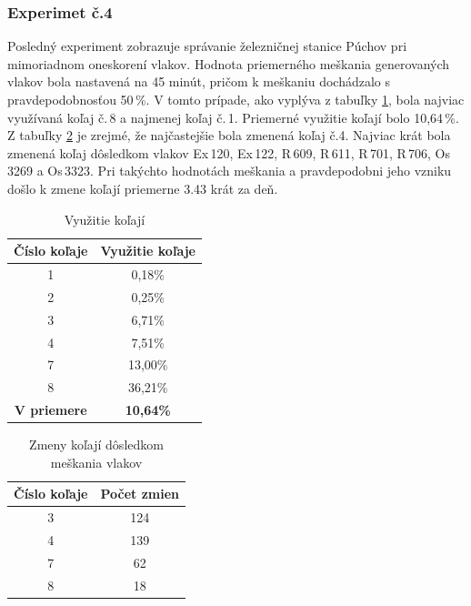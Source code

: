 \documentclass[12pt,a4paper,titlepage,final]{article}
\begin{document}
\subsubsection{Experimet č.4}

Posledný experiment zobrazuje správanie železničnej stanice Púchov pri mimoriadnom oneskorení vlakov. Hodnota priemerného meškania generovaných vlakov bola nastavená na 45 minút, pričom k  meškaniu dochádzalo s pravdepodobnosťou 50\,\%. V tomto prípade, ako vyplýva z tabuľky \ref{tab6}, bola najviac využívaná koľaj č.\,8 a najmenej koľaj č.\,1. Priemerné využitie koľají bolo 10,64\,\%. Z tabuľky \ref{tab7} je zrejmé, že najčastejšie bola zmenená koľaj č.4. Najviac krát bola zmenená koľaj dôsledkom vlakov Ex\,120, Ex\,122, R\,609, R\,611, R\,701, R\,706, Os\,3269 a Os\,3323. Pri takýchto hodnotách meškania a pravdepodobni jeho vzniku došlo k zmene koľají priemerne 3.43 krát za deň.

\begin{table}[h]
\centering
\begin{center}
\begin{tabular}{| c | c |}
\hline
{\textbf{Číslo koľaje}} & {\textbf{Využitie koľaje}} \\
\hline
1 & 0,18\% \\
2 & 0,25\% \\
3 & 6,71\% \\
4 & 7,51\% \\
7 & 13,00\% \\
8 & 36,21\% \\
\hline
{\textbf{V priemere}} & {\textbf{10,64\%}} \\
\hline
\end{tabular}
\caption{Využitie koľají}
\label{tab6}
\end{center}
\end{table}

\begin{table}[h]
\centering
\begin{center}
\begin{tabular}{| c | c |}
\hline
{\textbf{Číslo koľaje}} & {\textbf{Počet zmien}} \\
\hline
3 & 124 \\
4 & 139 \\
7 & 62 \\
8 & 18 \\
\hline
\end{tabular}
\caption{Zmeny koľají dôsledkom meškania vlakov}
\label{tab7}
\end{center}
\end{table}
\end{document}

